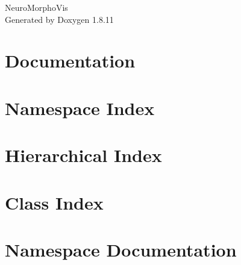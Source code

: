 \documentclass[twoside]{book}
\newcommand{\+}{\discretionary{\mbox{\scriptsize$\hookleftarrow$}}{}{}}
\newcommand{\clearemptydoublepage}{%
  \newpage{\pagestyle{empty}\cleardoublepage}%
}
\begin{document}
\hypersetup{pageanchor=false,
             bookmarksnumbered=true,
             pdfencoding=unicode
            }
\begin{titlepage}
\vspace*{7cm}
\begin{center}%
{\Large Neuro\+Morpho\+Vis }\\
\vspace*{1cm}
{\large Generated by Doxygen 1.8.11}\\
\end{center}
\end{titlepage}
\clearemptydoublepage
\tableofcontents
\clearemptydoublepage
{}
\hypersetup{pageanchor=true}

\chapter{Documentation}
\label{index}\hypertarget{index}{}
\chapter{Namespace Index}

\chapter{Hierarchical Index}

\chapter{Class Index}

\chapter{Namespace Documentation}




























\end{document}
